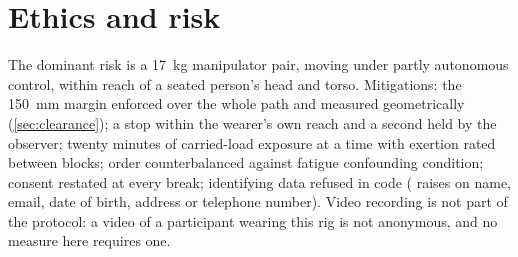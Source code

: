 \section{Ethics and risk}

The dominant risk is a \SI{17}{\kilo\gram} manipulator pair, moving under
partly autonomous control, within reach of a seated person's head and
torso. Mitigations: the \SI{150}{\milli\metre} margin enforced over the
whole path and measured geometrically (\cref{sec:clearance}); a stop within
the wearer's own reach and a second held by the observer; twenty minutes of
carried-load exposure at a time with exertion rated between blocks; order
counterbalanced against fatigue confounding condition; consent restated at
every break; identifying data refused in code
( raises on name, email, date of birth, address or
telephone number). Video recording is not part of the protocol: a video of a
participant wearing this rig is not anonymous, and no measure here requires
one.
